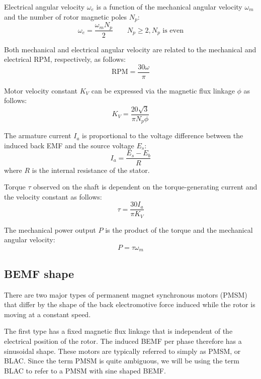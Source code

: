 \documentclass{zubaxdoc}
\begin{document}
Electrical angular velocity $\omega_e$ is a function of the mechanical angular velocity $\omega_m$
and the number of rotor magnetic poles $N_p$:
\begin{equation}\label{eq:speed_electrical_mechanical}
\omega_e = \frac{\omega_m N_p}{2}\qquad
N_p \geq 2, N_p\text{\ is even}
\end{equation}

Both mechanical and electrical angular velocity are related to the mechanical and electrical RPM,
respectively, as follows:
\begin{equation}
\text{RPM} = \frac{30 \omega }{\pi }
\end{equation}

Motor velocity constant $K_V$ can be expressed via the magnetic flux linkage $\phi$ as follows:
\begin{equation}
K_V = \frac{20 \sqrt{3}}{\pi  N_p \phi }
\end{equation}

The armature current $I_a$ is proportional to the voltage difference between the induced back EMF and
the source voltage $E_s$:
\begin{equation}
I_a = \frac{E_s - E_b}{R}
\end{equation}
where $R$ is the internal resistance of the stator.

Torque $\tau$ observed on the shaft is dependent on the torque-generating current and the velocity constant
as follows:
\begin{equation}
\tau = \frac{30 I_a}{\pi K_V}
\end{equation}

The mechanical power output $P$ is the product of the torque and the mechanical angular velocity:
\begin{equation}
P = \tau \omega_m
\end{equation}

\subsection{BEMF shape}

There are two major types of permanent magnet synchronous motors (PMSM) that differ by the shape of the back
electromotive force induced while the rotor is moving at a constant speed.

The first type has a fixed magnetic flux linkage that is independent of the electrical position of the rotor.
The induced BEMF per phase therefore has a sinusoidal shape.
These motors are typically referred to simply as PMSM, or BLAC.
Since the term PMSM is quite ambiguous, we will be using the term BLAC to refer to a PMSM with sine shaped BEMF.
\end{document}
